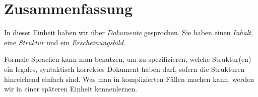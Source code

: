 \section{Zusammenfassung}

In dieser Einheit haben wir über \emph{Dokumente} gesprochen. Sie
haben einen \emph{Inhalt}, eine \emph{Struktur} und ein
\emph{Erscheinungsbild}.

Formale Sprachen kann man \zB benutzen, um zu spezifizieren, welche
Struktur(en) ein legales, \dh syntaktisch korrektes Dokument haben
darf, sofern die Strukturen hinreichend einfach sind. Was man in
komplizierten Fällen machen kann, werden wir in einer späteren Einheit
kennenlernen.
 



\cleardoublepage


